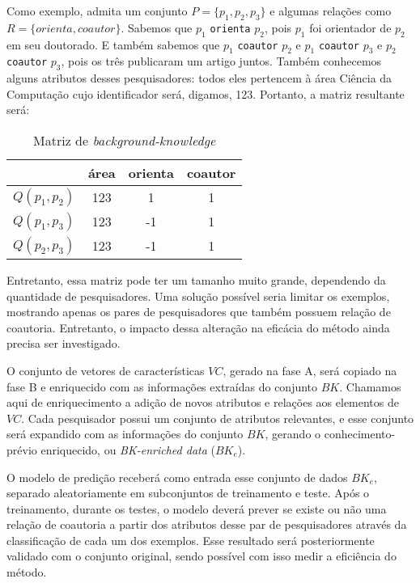 Como exemplo, admita um conjunto $P = \{ p_1, p_2, p_3 \}$ e algumas relações
como $R = \{ orienta, coautor \}$. Sabemos que $p_1$ \texttt{orienta} $p_2$, pois $p_1$ foi orientador de $p_2$ em seu doutorado. E também sabemos que $p_1$ \texttt{coautor} $p_2$ e $p_1$ \texttt{coautor} $p_3$ e $p_2$ \texttt{coautor} $p_3$, pois os três publicaram um artigo juntos. Também conhecemos alguns atributos desses pesquisadores: todos eles pertencem à área Ciência da Computação cujo identificador será, digamos, 123. Portanto, a matriz resultante será:

\begin{table}[h!]
    \centering
    \begin{tabular}{|c|c|c|c|}
     \hline
      & área & orienta & coautor   \\
     \hline\hline
     $Q(p_1, p_2)$ & 123 & 1  & 1  \\
     \hline
     $Q(p_1, p_3)$ & 123 & -1 & 1  \\
     \hline
     $Q(p_2, p_3)$ & 123 & -1 & 1  \\
     \hline
    \end{tabular}
    \caption{Matriz de \textit{background-knowledge} }
    \label{matriz-relacoes}
\end{table}

Entretanto, essa matriz pode ter um tamanho muito grande, dependendo da quantidade de pesquisadores. Uma solução possível seria limitar os exemplos, mostrando apenas os pares de pesquisadores que também possuem relação de coautoria. Entretanto, o impacto dessa alteração na eficácia do método ainda precisa ser investigado.

O conjunto de vetores de características $VC$, gerado na fase A, será copiado na fase B e enriquecido com as informações extraídas do conjunto $BK$. Chamamos aqui de enriquecimento a adição de novos atributos e relações aos elementos de $VC$. Cada pesquisador possui um conjunto de atributos relevantes, e esse conjunto será expandido com as informações do conjunto $BK$, gerando o conhecimento-prévio enriquecido, ou \textit{BK-enriched data} ($BK_e$).

O modelo de predição receberá como entrada esse conjunto de dados $BK_e$, separado aleatoriamente em subconjuntos de treinamento e teste. Após o treinamento, durante os testes, o modelo deverá prever se existe ou não uma relação de coautoria a partir dos atributos desse par de pesquisadores através da classificação de cada um dos exemplos. Esse resultado será posteriormente validado com o conjunto original, sendo possível com isso medir a eficiência do método.

